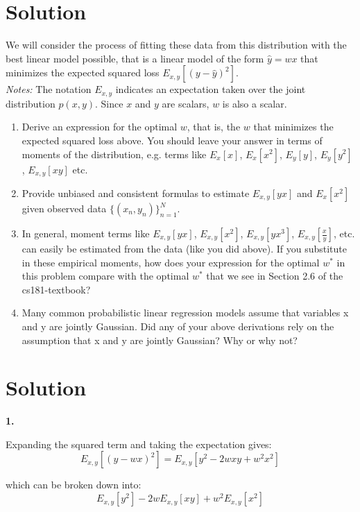 \documentclass[submit]{harvardml}
\newenvironment{solution}
  {\color{blue}\section*{Solution}}
{}
\begin{document}
\begin{solution}
\begin{problem}
  \noindent We will consider the process of fitting these data from this distribution with the best linear model
  possible, that is a linear model of the form $\hat{y} = wx$ that
  minimizes the expected squared loss $E_{x,y}[ ( y - \hat{y} )^2
  ]$.\\

\noindent \emph{Notes:} The notation $E_{x, y}$ indicates an
expectation taken over the joint distribution $p(x,y)$.  Since $x$ and
$y$ are scalars, $w$ is also a scalar.
  
  \begin{enumerate}

  \item Derive an expression for the optimal $w$, that is, the $w$
    that minimizes the expected squared loss above.  You should leave
    your answer in terms of moments of the distribution, e.g. terms
    like $E_x[x]$, $E_x[x^2]$, $E_y[y]$, $E_y[y^2]$, $E_{x,y}[xy]$
    etc.

\item Provide unbiased and consistent formulas to estimate $E_{x, y}[yx]$
 and $E_x[x^2]$ given observed data $\{(x_n,y_n)\}_{n=1}^N$.

\item In general, moment terms like $E_{x, y}[yx]$, $E_{x, y}[x^2]$,
  $E_{x, y}[yx^3]$, $E_{x, y}[\frac{x}{y}]$, etc. can easily be
  estimated from the data (like you did above).  If you substitute in
  these empirical moments, how does your expression for the optimal
  $w^*$ in this problem compare with the optimal $w^*$ that we see in
  Section 2.6 of the cs181-textbook?

\item Many common probabilistic linear regression models assume that
  variables x and y are jointly Gaussian.  Did any of your above
  derivations rely on the assumption that x and y are jointly
  Gaussian?  Why or why not?
    
\end{enumerate}
  
\end{problem}

\begin{solution}

\bigskip
\textbf{1.}

Expanding the squared term and taking the expectation gives:
$$
E_{x, y}[(y - wx)^2] = E_{x, y}[y^2 - 2wxy + w^2x^2]
$$

which can be broken down into:
$$
E_{x, y}[y^2] - 2wE_{x, y}[xy] + w^2E_{x, y}[x^2]
$$


\end{solution}
\end{solution}
\end{document}
